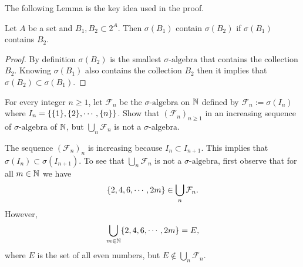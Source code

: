 \begin{remark}
	The following Lemma is the key idea used in the proof.
	\begin{lemma}
		Let $ A $ be a set and $ B_1, B_2 \subset 2^A $. Then $ \sigma(B_1) $ contain $ \sigma(B_2) $ if $ \sigma(B_1) $ contains $ B_2 $.
	\end{lemma}
	\begin{proof}
		By definition $ \sigma(B_2) $ is the smallest $\sigma\text{-algebra}$ that contains the collection $ B_2 $. Knowing $ \sigma(B_1) $ also contains the collection $ B_2 $ then it implies that $ \sigma(B_2) \subset \sigma(B_1) $.
	\end{proof}
\end{remark}

\begin{problem}
	For every integer $ n\geq 1 $, let $ \mathcal{F}_n $ be the $\sigma\text{-algebra}$ on $ \mathbb{N} $ defined by $ \mathcal{F}_n := \sigma(I_n) $ where $ I_n = \{\{1\},\{2\},\cdots,\{n\}\} $. Show that $ (\mathcal{F}_n)_{n\geq 1} $ in an increasing sequence of $\sigma\text{-algebra}$ of $ \mathbb{N} $, but $ \bigcup_n \mathcal{F}_n $ is not a $\sigma\text{-algebra}$.
\end{problem}
\begin{solution}
	The sequence $ (\mathcal{F}_n)_n $ is increasing because $ I_{n} \subset I_{n+1} $. This implies that $ \sigma(I_n) \subset \sigma(I_{n+1}) $. To see that $ \bigcup_n \mathcal{F}_n $ is not a $\sigma\text{-algebra}$, first observe that for all $ m\in \mathbb{N} $ we have 
	\[ \{2,4,6,\cdots,2m\} \in \bigcup_n \mathcal{F}_n. \]
	However, 
	\[ \bigcup_{m\in\mathbb{N}} \{2,4,6,\cdots,2m\} = E, \]
	where $ E $ is the set of all even numbers, but $ E \notin \bigcup_n \mathcal{F}_n $.
\end{solution}

